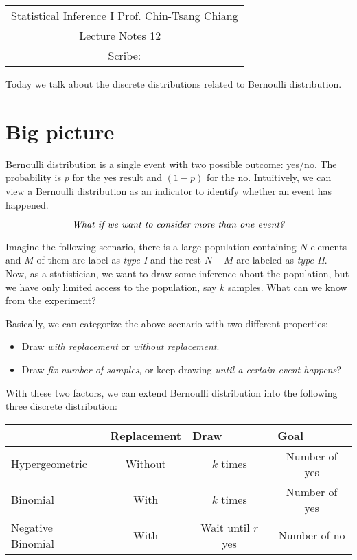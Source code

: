 \documentclass[../Distributions.tex]{subfiles}
\begin{document}
	\begin{center}
		\renewcommand{\arraystretch}{2}
		\begin{bfseries}
			\begin{tabular}{|c|}
				\hline
				Statistical Inference I \hfill Prof. Chin-Tsang Chiang\\
				\hspace{15em} {\large Lecture Notes 12} \hspace{15em}\ \\
				\lecdate \hfill Scribe: \scribe\\
				\hline
			\end{tabular}
			\renewcommand{\arraystretch}{1}
		\end{bfseries}
	\end{center}
Today we talk about the discrete distributions related to Bernoulli distribution.
\section{Big picture}
Bernoulli distribution is a single event with two possible outcome: yes/no. The probability is $p$ for the yes result and $(1-p)$ for the no. Intuitively, we can view a Bernoulli distribution as an indicator to identify whether an event has happened.

$$\mbox{\it What if we want to consider more than one event?}$$

Imagine the following scenario, there is a large population containing $N$ elements and $M$ of them are label as {\it type-I} and the rest $N-M$ are labeled as {\it type-II}. Now, as a statistician, we want to draw some inference about the population, but we have only limited access to the population, say $k$ samples. What can we know from the experiment?

Basically, we can categorize the above scenario with two different properties: 
\begin{itemize}
	\item Draw {\it with replacement} or {\it without replacement}.
	\item Draw {\it fix number of samples}, or keep drawing {\it until a certain event happens}?
\end{itemize}

With these two factors, we can extend Bernoulli distribution into the following three discrete distribution:

\begin{table}[h]
	\centering
	\begin{tabular}{|l|c|c|c|}
		\hline
		& \multicolumn{1}{l|}{Replacement} & \multicolumn{1}{l|}{Draw} & \multicolumn{1}{l|}{Goal} \\ \hline
		Hypergeometric    & Without                          & $k$ times                 & Number of yes             \\ \hline
		Binomial          & With                             & $k$ times                 & Number of yes             \\ \hline
		Negative Binomial & With                             & Wait until $r$ yes        & Number of no              \\ \hline
	\end{tabular}
\end{table}
\end{document}
